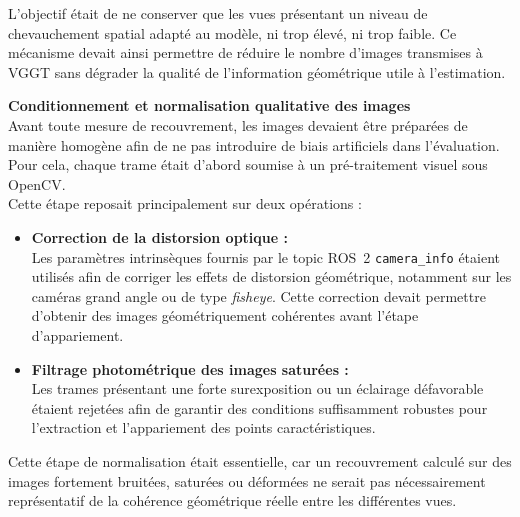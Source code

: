 \documentclass[12pt,a4paper,oneside]{report}
\begin{document}
\hspace*{.3cm}L'objectif était de ne conserver que les vues présentant un niveau de chevauchement spatial adapté au modèle, ni trop élevé, ni trop faible. Ce mécanisme devait ainsi permettre de réduire le nombre d'images transmises à VGGT sans dégrader la qualité de l'information géométrique utile à l'estimation.\\

\par\bigskip
\par\bigskip

\hspace*{0.4cm}\textbf{Conditionnement et normalisation qualitative des images}\\

\hspace*{.3cm}Avant toute mesure de recouvrement, les images devaient être préparées de manière homogène afin de ne pas introduire de biais artificiels dans l'évaluation. Pour cela, chaque trame était d'abord soumise à un pré-traitement visuel sous OpenCV.\\
Cette étape reposait principalement sur deux opérations :
\begin{itemize}[itemsep=0.5em]

    \item \textbf{Correction de la distorsion optique :}\\
    Les paramètres intrinsèques fournis par le topic ROS~2 \texttt{camera\_info} étaient utilisés afin de corriger les effets de distorsion géométrique, notamment sur les caméras grand angle ou de type \textit{fisheye}. Cette correction devait permettre d'obtenir des images géométriquement cohérentes avant l'étape d'appariement.

    \item \textbf{Filtrage photométrique des images saturées :}\\
    Les trames présentant une forte surexposition ou un éclairage défavorable étaient rejetées afin de garantir des conditions suffisamment robustes pour l'extraction et l'appariement des points caractéristiques.

\end{itemize}
\par\bigskip
Cette étape de normalisation était essentielle, car un recouvrement calculé sur des images fortement bruitées, saturées ou déformées ne serait pas nécessairement représentatif de la cohérence géométrique réelle entre les différentes vues.\\
\end{document}
